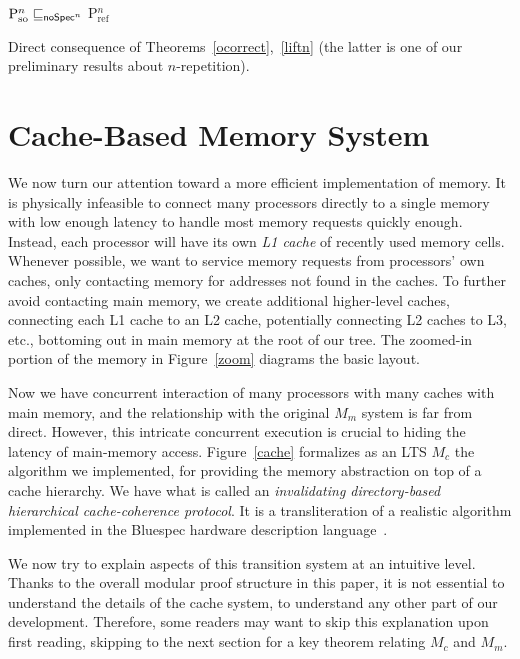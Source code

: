 \begin{corollary}
\label{ges}
$\text{P$^n_\text{so}$} \sqsubseteq_{\mathsf{noSpec}^n}$ P$_\text{ref}^n$
\end{corollary}
\begin{prf}
Direct consequence of Theorems~\ref{ocorrect},~\ref{liftn} (the
latter is one of our preliminary results about $n$-repetition).
\end{prf}

\section{Cache-Based Memory System}\label{sec:cc}

We now turn our attention toward a more efficient implementation of
memory.  It is physically infeasible to connect many processors
directly to a single memory with low enough latency to handle most
memory requests quickly enough.  Instead, each processor will have its
own \emph{L1 cache} of recently used memory cells.  Whenever possible, we
want to service memory requests from processors' own caches, only
contacting memory for addresses not found in the caches.  To further
avoid contacting main memory, we create additional higher-level
caches, connecting each L1 cache to an L2 cache, potentially
connecting L2 caches to L3, etc., bottoming out in main memory at the
root of our tree. The zoomed-in portion of the memory in Figure~\ref{zoom}
diagrams the basic layout.

Now we have concurrent interaction of many processors with many caches
with main memory, and the relationship with the original $M_m$ system
is far from direct.  However, this intricate concurrent execution is
crucial to hiding the latency of main-memory access.
Figure~\ref{cache} formalizes as an LTS $M_c$ the algorithm we implemented,
for providing the memory abstraction on top of a cache hierarchy.
We have what is called an \emph{invalidating directory-based hierarchical
cache-coherence protocol}.  It is a transliteration of a realistic
algorithm implemented in the Bluespec hardware description
language~\cite{Bluespec:TFRG}. 

We now try to explain aspects of this transition system at an
intuitive level.  Thanks to the overall modular proof structure in
this paper, it is not essential to understand the details of the cache
system, to understand any other part of our development.  Therefore,
some readers may want to skip this explanation upon first reading,
skipping to the next section for a key theorem relating $M_c$ and $M_m$.

